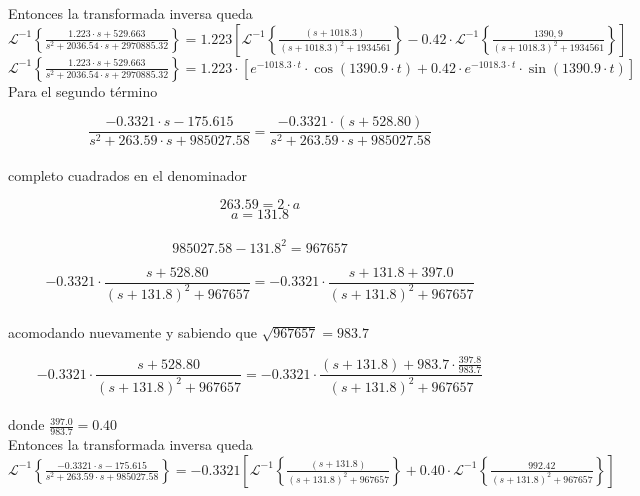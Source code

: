 \documentclass[10pt,a4paper]{article}
\begin{document}
    Entonces la transformada inversa queda \\

    $\mathscr{L}^{-1}\left\{\frac{1.223 \cdot s + 529.663}{s^{2}+2036.54 \cdot s + 2970885.32}\right\}=1.223\left[\mathscr{L}^{-1}\left\{\frac{(s +1018.3)}{{(s+1018.3)^{2}}+1934561}\right\}-0.42 \cdot \mathscr{L}^{-1}\left\{\frac{1390,9}{{(s+1018.3)^{2}}+1934561}\right\}\right] $ \\

    $\mathscr{L}^{-1}\left\{\frac{1.223 \cdot s + 529.663}{s^{2}+2036.54 \cdot s + 2970885.32}\right\}= 1.223\cdot \left[ e^{-1018.3 \cdot t} \cdot \cos{(1390.9\cdot t)} + 0.42 \cdot e^{-1018.3 \cdot t} \cdot \sin{(1390.9\cdot t)}  \right] $ \\


    Para el segundo término

    \[\frac{-0.3321 \cdot s - 175.615}{s^{2}+263.59 \cdot s + 985027.58} = \frac{-0.3321\cdot(s + 528.80)}{s^{2}+263.59 \cdot s + 985027.58}\] \\

    completo cuadrados en el denominador

    \[263.59 = 2\cdot a\]
    \[a = 131.8\] \\

    \[985027.58-131.8^2 = 967657\]



    \[-0.3321\cdot \frac{s + 528.80}{{(s + 131.8)^{2}}+967657} = -0.3321\cdot\frac{s +131.8 + 397.0}{{(s+131.8)^{2}}+967657}\] \\

    acomodando nuevamente y sabiendo que $\sqrt{967657} = 983.7$


    \[-0.3321\cdot \frac{s + 528.80}{{(s + 131.8)^{2}}+967657} = -0.3321\cdot \frac{(s +131.8) + 983.7\cdot \frac{397.8}{983.7}}{{(s+131.8)^{2}}+967657}\] \\

    donde $\frac{397.0}{983.7} = 0.40$ \\

    Entonces la transformada inversa queda \\

    $\mathscr{L}^{-1}\left\{\frac{-0.3321 \cdot s - 175.615}{s^{2}+263.59 \cdot s + 985027.58}\right\}=-0.3321\left[\mathscr{L}^{-1}\left\{\frac{(s +131.8)}{{(s+131.8)^{2}}+967657}\right\}+0.40 \cdot \mathscr{L}^{-1}\left\{\frac{992.42}{{(s+131.8)^{2}}+967657}\right\}\right] $ \\
\end{document}
